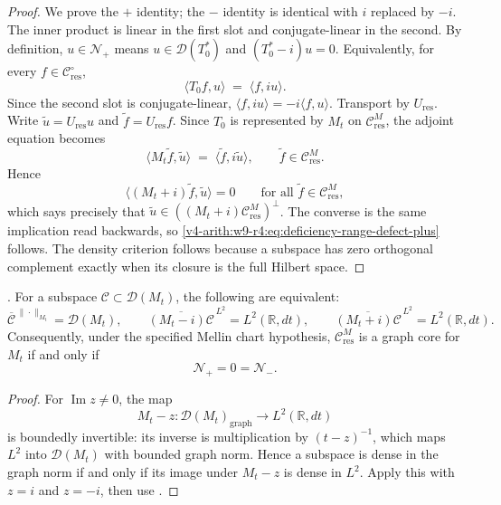 \begin{proof}
We prove the \(+\) identity; the \(-\) identity is identical with
\(i\) replaced by \(-i\). The inner product is linear in the first
slot and conjugate-linear in the second. By definition,
\(u\in\mathcal{N}_{+}\) means \(u\in\mathcal{D}(T_{0}^{*})\) and
\((T_{0}^{*}-i)u=0\). Equivalently, for every
\(f\in\mathcal{C}_{\mathrm{res}}^{\circ}\),
\[
\langle T_{0}f,u\rangle
\;=\;
\langle f,iu\rangle .
\]
Since the second slot is conjugate-linear,
\(\langle f,iu\rangle=-i\langle f,u\rangle\).
Transport by \(U_{\mathrm{res}}\). Write
\(\tilde u=U_{\mathrm{res}}u\) and
\(\tilde f=U_{\mathrm{res}}f\). Since \(T_{0}\) is represented by
\(M_{t}\) on \(\mathcal{C}_{\mathrm{res}}^{M}\), the adjoint equation
becomes
\[
\langle M_{t}\tilde f,\tilde u\rangle
\;=\;
\langle \tilde f,i\tilde u\rangle ,
\qquad
\tilde f\in\mathcal{C}_{\mathrm{res}}^{M}.
\]
Hence
\[
\langle (M_{t}+i)\tilde f,\tilde u\rangle=0
\qquad
\text{for all }\tilde f\in\mathcal{C}_{\mathrm{res}}^{M},
\]
which says precisely that
\(\tilde u\in((M_{t}+i)\mathcal{C}_{\mathrm{res}}^{M})^{\perp}\).
The converse is the same implication read backwards, so
\eqref{v4-arith:w9-r4:eq:deficiency-range-defect-plus} follows.
The density criterion follows because a subspace has zero orthogonal
complement exactly when its closure is the full Hilbert space.
\end{proof}

\begin{corollary}
\label{v4-arith:w9-r4:cor:bulk-deficiency-graph-core}
\ClaimStatusProvedHere. For a subspace
\(\mathcal{C}\subset\mathcal{D}(M_t)\), the following are equivalent:
\[
\overline{\mathcal{C}}^{\,\|\cdot\|_{M_t}}=\mathcal{D}(M_t),
\qquad
\overline{(M_t-i)\mathcal{C}}^{\,L^2}=L^2(\mathbb R,dt),
\qquad
\overline{(M_t+i)\mathcal{C}}^{\,L^2}=L^2(\mathbb R,dt).
\]
Consequently, under the specified Mellin chart hypothesis,
\(\mathcal{C}_{\mathrm{res}}^{M}\) is a graph core for \(M_t\) if and
only if
\[
\mathcal{N}_{+}=0=\mathcal{N}_{-}.
\]
\end{corollary}

\begin{proof}
For \(\operatorname{Im}z\neq0\), the map
\[
M_{t}-z\colon \mathcal{D}(M_{t})_{\mathrm{graph}}\to L^{2}(\mathbb{R},dt)
\]
is boundedly invertible: its inverse is multiplication by
\((t-z)^{-1}\), which maps \(L^{2}\) into \(\mathcal{D}(M_{t})\) with
bounded graph norm. Hence a subspace is dense in the graph norm if
and only if its image under \(M_t-z\) is dense in \(L^2\). Apply this
with \(z=i\) and \(z=-i\), then use
.
\end{proof}

